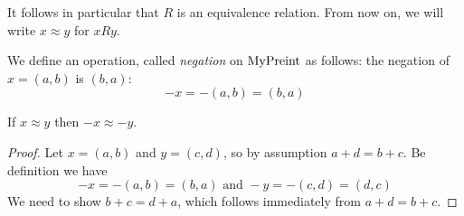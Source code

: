 It follows in particular that $R$ is an equivalence relation. From now on, we will write $x \approx y$ for
$x R y$.

\begin{definition}
    \label{MyPreint.neg}
    \leanok
We define an operation, called \emph{negation} on $\mathrm{MyPreint}$ as follows: the negation of $x = (a,b)$ is
$(b,a)$:
\[
-x = -(a,b) = (b,a)
\]
\end{definition}

\begin{lemma}
    \label{neg_quotient}
    \leanok
If $x \approx y$ then $-x \approx -y$.
\end{lemma}
\begin{proof}
Let $x = (a,b)$ and $y = (c,d)$, so by assumption $a + d = b + c$. Be definition we have
\[
-x=-(a,b)=(b,a) \mbox{ and } -y=-(c,d)=(d,c)
\]
We need to show $b+c=d+a$, which follows immediately from $a + d = b + c$.
\end{proof}